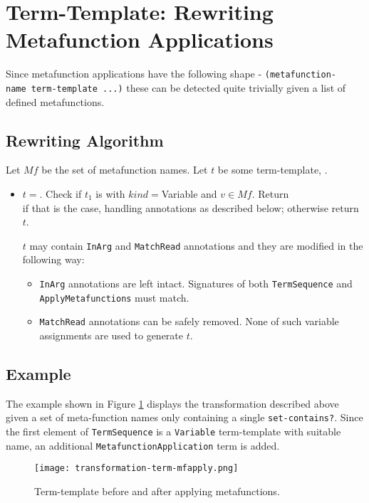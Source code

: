 \section{Term-Template: Rewriting Metafunction Applications}

Since metafunction applications have the following shape - \texttt{(metafunction-name\ term-template\ ...)} these can be detected quite trivially given a list of defined metafunctions. 

\subsection{Rewriting Algorithm}
Let $Mf$ be the set of metafunction names. Let $t$ be some term-template, . 
\begin{itemize}
\item $t=$\space \TermSequence. Check if $t_1$ is \TermLiteral\space with $kind=$\space Variable and $v \in Mf$. Return \\ \ApplyMetafunction[$v$][$t$][false] if that is the case, handling annotations as described below; otherwise return $t$. 

$t$ may contain \texttt{InArg} and \texttt{MatchRead} annotations and they are modified in the following way:
\begin{itemize}
\item
\texttt{InArg} annotations are left intact. Signatures of both \texttt{TermSequence} and \texttt{ApplyMetafunctions} must match.
\item
\texttt{MatchRead} annotations can be safely removed. None of such variable assignments are used to generate $t$.
\end{itemize}
\end{itemize}
\subsection{Example}
The example shown in Figure \ref{transformation-term-mfapply} displays the transformation described above given a set of meta-function names only containing a single \texttt{set-contains?}. Since the first element of \texttt{TermSequence} is a \texttt{Variable} term-template with suitable name, an additional \texttt{MetafunctionApplication} term is added.

\begin{figure}[H]
\texttt{[image: transformation-term-mfapply.png]}
\caption{Term-template before and after applying metafunctions.}
\label{transformation-term-mfapply}
\end{figure}
